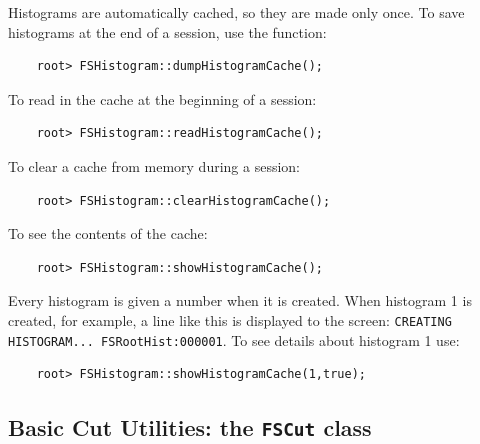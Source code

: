 \documentclass[11pt]{article}
\begin{document}
Histograms are automatically cached, so they are made only once.  To save histograms at the end of a session, use the function:
\begin{verbatim}
    root> FSHistogram::dumpHistogramCache(); 
\end{verbatim}
To read in the cache at the beginning of a session:
\begin{verbatim}
    root> FSHistogram::readHistogramCache(); 
\end{verbatim}
To clear a cache from memory during a session:
\begin{verbatim}
    root> FSHistogram::clearHistogramCache(); 
\end{verbatim}
To see the contents of the cache:
\begin{verbatim}
    root> FSHistogram::showHistogramCache(); 
\end{verbatim}
Every histogram is given a number when it is created.  When histogram 1 is created, for example, a line like this is displayed to the screen:
{\tt CREATING HISTOGRAM... FSRootHist:000001}.  To see details about histogram 1 use:
\begin{verbatim}
    root> FSHistogram::showHistogramCache(1,true); 
\end{verbatim}

\subsection{Basic Cut Utilities: the {\tt FSCut} class}
\label{sec:cut}
\end{document}
